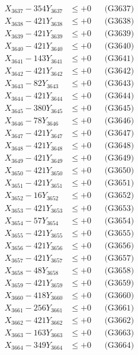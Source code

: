 \documentclass[a4paper,10pt]{article}
\begin{document}
{\begin{align}
X_{3637} - 354Y_{3637} &\leq +0 && \text{(G3637)} \\
X_{3638} - 421Y_{3638} &\leq +0 && \text{(G3638)} \\
X_{3639} - 421Y_{3639} &\leq +0 && \text{(G3639)} \\
X_{3640} - 421Y_{3640} &\leq +0 && \text{(G3640)} \\
\allowbreak
X_{3641} - 143Y_{3641} &\leq +0 && \text{(G3641)} \\
X_{3642} - 421Y_{3642} &\leq +0 && \text{(G3642)} \\
X_{3643} - 82Y_{3643} &\leq +0 && \text{(G3643)} \\
X_{3644} - 421Y_{3644} &\leq +0 && \text{(G3644)} \\
X_{3645} - 380Y_{3645} &\leq +0 && \text{(G3645)} \\
X_{3646} - 78Y_{3646} &\leq +0 && \text{(G3646)} \\
X_{3647} - 421Y_{3647} &\leq +0 && \text{(G3647)} \\
X_{3648} - 421Y_{3648} &\leq +0 && \text{(G3648)} \\
X_{3649} - 421Y_{3649} &\leq +0 && \text{(G3649)} \\
X_{3650} - 421Y_{3650} &\leq +0 && \text{(G3650)} \\
\allowbreak
X_{3651} - 421Y_{3651} &\leq +0 && \text{(G3651)} \\
X_{3652} - 16Y_{3652} &\leq +0 && \text{(G3652)} \\
X_{3653} - 421Y_{3653} &\leq +0 && \text{(G3653)} \\
X_{3654} - 57Y_{3654} &\leq +0 && \text{(G3654)} \\
X_{3655} - 421Y_{3655} &\leq +0 && \text{(G3655)} \\
X_{3656} - 421Y_{3656} &\leq +0 && \text{(G3656)} \\
X_{3657} - 421Y_{3657} &\leq +0 && \text{(G3657)} \\
X_{3658} - 48Y_{3658} &\leq +0 && \text{(G3658)} \\
X_{3659} - 421Y_{3659} &\leq +0 && \text{(G3659)} \\
X_{3660} - 418Y_{3660} &\leq +0 && \text{(G3660)} \\
\allowbreak
X_{3661} - 256Y_{3661} &\leq +0 && \text{(G3661)} \\
X_{3662} - 421Y_{3662} &\leq +0 && \text{(G3662)} \\
X_{3663} - 163Y_{3663} &\leq +0 && \text{(G3663)} \\
X_{3664} - 349Y_{3664} &\leq +0 && \text{(G3664)} \\

\end{align}}
\end{document}
